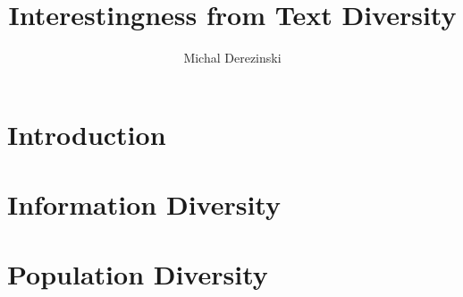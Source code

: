 \documentclass{article} %
\title{Interestingness from Text Diversity}
\author{Michal Derezinski}
\begin{document}
\maketitle



\begin{abstract}%
\end{abstract}



\section{Introduction}
\label{sec:introduction}



\section{Information Diversity}
\label{sec:information-diversity}
 


\section{Population Diversity}
\label{sec:popular-diversity}



\end{document}
